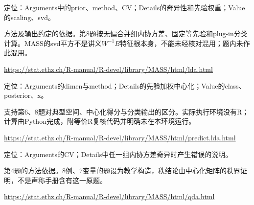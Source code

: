 \par\noindent\begin{minipage}{\linewidth}\label{src:MASS-LDA}
\par
定位：Arguments中的prior、method、CV；Details的奇异性和先验权重；Value的scaling、svd。\par
方法及输出约定的依据。第8题按无偏合并组内协方差、固定等先验和plug-in分类计算。MASS的svd平方不是讲义$W^{-1}B$特征根本身，不能未经核对混用；题内未作此混用。\par
{\small\url{https://stat.ethz.ch/R-manual/R-devel/library/MASS/html/lda.html}}\par
\end{minipage}\par\medskip

\par\noindent\begin{minipage}{\linewidth}\label{src:MASS-PREDICT}
\par
定位：Arguments的dimen与method；Details的先验加权中心化；Value的class、posterior、x。\par
支持第6、8题对典型空间、中心化得分与分类输出的区分。实际执行环境没有R；计算由Python完成，附等价R复核代码并明确未在本环境运行。\par
{\small\url{https://stat.ethz.ch/R-manual/R-devel/library/MASS/html/predict.lda.html}}\par
\end{minipage}\par\medskip

\par\noindent\begin{minipage}{\linewidth}\label{src:MASS-QDA}
\par
定位：Arguments的CV；Details中任一组内协方差奇异时产生错误的说明。\par
第4题的方法依据。8例、7变量的题设为教学构造，秩结论由中心化矩阵的秩界证明，不是声称手册含有这一原题。\par
{\small\url{https://stat.ethz.ch/R-manual/R-devel/library/MASS/html/qda.html}}\par
\end{minipage}\par\medskip

